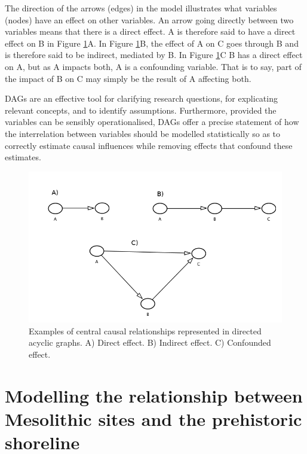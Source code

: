 \documentclass[
  12pt,
  a4paper,
  oneside]{book}
\begin{document}
The direction of the arrows (edges) in the model illustrates what variables (nodes) have an effect on other variables. An arrow going directly between two variables means that there is a direct effect. A is therefore said to have a direct effect on B in Figure \ref{fig:dag}A. In Figure \ref{fig:dag}B, the effect of A on C goes through B and is therefore said to be indirect, mediated by B. In Figure \ref{fig:dag}C B has a direct effect on A, but as A impacts both, A is a confounding variable. That is to say, part of the impact of B on C may simply be the result of A affecting both.

DAGs are an effective tool for clarifying research questions, for explicating relevant concepts, and to identify assumptions. Furthermore, provided the variables can be sensibly operationalised, DAGs offer a precise statement of how the interrelation between variables should be modelled statistically so as to correctly estimate causal influences while removing effects that confound these estimates.

\begin{figure}

{\centering \includegraphics[width=1\linewidth]{figures/dagitty} 

}

\caption{Examples of central causal relationships represented in directed acyclic graphs. A) Direct effect. B) Indirect effect. C) Confounded effect.}\label{fig:dag}
\end{figure}

\hypertarget{modelling-the-relationship-between-mesolithic-sites-and-the-prehistoric-shoreline}{%
\section{Modelling the relationship between Mesolithic sites and the prehistoric shoreline}\label{modelling-the-relationship-between-mesolithic-sites-and-the-prehistoric-shoreline}}
\end{document}
